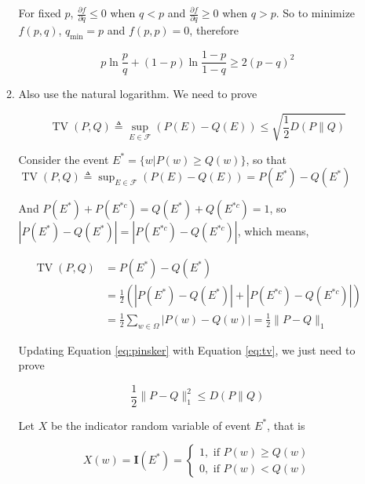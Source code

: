 \documentclass[a4paper]{article}
\begin{document}
\begin{enumerate}
\begin{enumerate}
  For fixed $p$, $\frac{\partial f}{\partial q} \leqslant 0$ when $q<p$ and $\frac{\partial f}{\partial q} \geqslant 0$ when $q>p$. So to minimize $f(p,q)$, $q_{\min}=p$ and $f(p,p)=0$, therefore  

  \begin{equation}
    p \ln \frac{p}{q} + (1-p)\ln \frac{1-p}{1-q}  \geqslant 2(p-q)^2
  \end{equation}

  \item Also use the natural logarithm. We need to prove 
  
  \begin{equation}\label{eq:pinsker}
    \operatorname{TV}(P, Q) \triangleq \sup _{E \in \mathcal{F}}(P(E)-Q(E))\leqslant \sqrt{\frac {1}{2} D(P \| Q)} 
  \end{equation}
  
  Consider the event $E^* = \{w| P(w)\geqslant Q(w)  \}$, so that $\operatorname{TV}(P, Q) \triangleq \sup _{E \in \mathcal{F}}(P(E)-Q(E)) = P(E^*) - Q(E^*)$

  And $P(E^*) + P(E^{*c}) = Q(E^*) + Q(E^{*c}) = 1$, so $|P(E^*) -Q(E^*)|= | P(E^{*c})- Q(E^{*c})|$,  which means,


  \begin{equation}\label{eq:tv}
    \begin{aligned}
      \operatorname{TV}(P, Q)&  = P(E^*) - Q(E^*) \\ 
      &= \frac 1 2 \left(|P(E^*) -Q(E^*)|+| P(E^{*c})- Q(E^{*c})|\right) \\
      & = \frac 1 2\sum_{w\in \Omega} |P(w)-Q(w)| = \frac 1 2 \|P-Q \|_1
    \end{aligned}
  \end{equation}

  Updating Equation \ref{eq:pinsker} with Equation \ref{eq:tv}, we just need to prove 

  \begin{equation}
    \frac 1 2 \|P-Q \|^2_1 \leqslant  D(P \| Q)
  \end{equation}
  
  Let $X$ be the indicator random variable of event $E^*$, that is

  \begin{equation}
    X(w) = \mathbf{I}(E^*) = \left\{ \begin{aligned}
      1, \text{ if } P(w) \geqslant Q(w) \\
      0, \text{ if } P(w) < Q(w)
    \end{aligned}
      \right.
  \end{equation}


\end{enumerate}
\end{enumerate}
\end{document}
